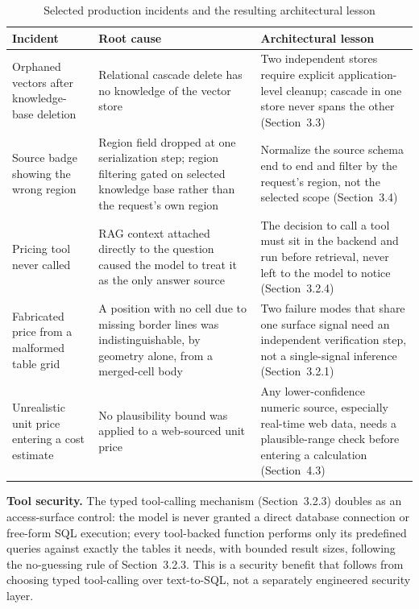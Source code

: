 \documentclass[11pt,a4paper]{article}
\begin{document}
\begin{table}[htbp]
\centering
\caption{Selected production incidents and the resulting architectural lesson}
\label{tab:production-incidents}
\footnotesize
\renewcommand{\arraystretch}{1.3}
\begin{tabularx}{\textwidth}{|p{}|X|X|}
\hline
\rowcolor{tableheader}
\textbf{Incident} & \textbf{Root cause} & \textbf{Architectural lesson} \\
\hline
Orphaned vectors after knowledge-base deletion &
Relational cascade delete has no knowledge of the vector store &
Two independent stores require explicit application-level cleanup; cascade
in one store never spans the other (Section~3.3) \\
\hline
Source badge showing the wrong region &
Region field dropped at one serialization step; region filtering gated on
selected knowledge base rather than the request's own region &
Normalize the source schema end to end and filter by the request's region,
not the selected scope (Section~3.4) \\
\hline
Pricing tool never called &
RAG context attached directly to the question caused the model to treat it
as the only answer source &
The decision to call a tool must sit in the backend and run before
retrieval, never left to the model to notice (Section~3.2.4) \\
\hline
Fabricated price from a malformed table grid &
A position with no cell due to missing border lines was indistinguishable,
by geometry alone, from a merged-cell body &
Two failure modes that share one surface signal need an independent
verification step, not a single-signal inference (Section~3.2.1) \\
\hline
Unrealistic unit price entering a cost estimate &
No plausibility bound was applied to a web-sourced unit price &
Any lower-confidence numeric source, especially real-time web data, needs a
plausible-range check before entering a calculation (Section~4.3) \\
\hline
\end{tabularx}
\end{table}
\FloatBarrier

\textbf{Tool security.} The typed tool-calling mechanism (Section~3.2.3)
doubles as an access-surface control: the model is never granted a direct
database connection or free-form SQL execution; every tool-backed function
performs only its predefined queries against exactly the tables it needs,
with bounded result sizes, following the no-guessing rule of
Section~3.2.3. This is a security benefit that follows from choosing
typed tool-calling over text-to-SQL, not a separately engineered security
layer.
\end{document}
